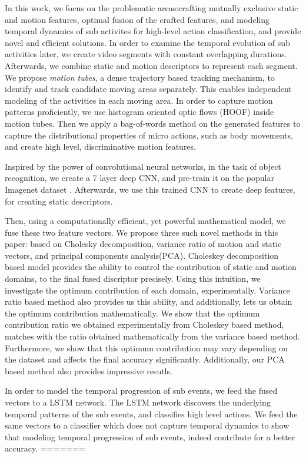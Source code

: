 In this work, we focus on the problematic areas:crafting mutually exclusive static and motion features, optimal fusion of the crafted features, and 
modeling temporal dynamics of sub activites for high-level action classification, and provide 
novel and efficient solutions. In order to examine the temporal evolution 
of sub activities later, we create video segments with constant overlapping durations. Afterwards, we combine static and motion
descriptors to represent each segment. We propose \textit{motion tubes},
a dense trajectory \cite{wang2011action} based tracking mechanism, to identify and track candidate moving areas
separately. This enables independent modeling of the activities in each moving area.
In order to capture motion patterns proficiently, we use histogram oriented optic flows (HOOF) \cite{chaudhry2009histograms}
inside motion tubes. Then we apply a bag-of-words method on the generated 
features to capture the distributional properties of micro actions, such as body movements, and create high level, discriminative motion features. 

Inspired by the power of convolutional neural networks, in the task of object recognition, we create a 7 layer deep
CNN, and pre-train it on the popular Imagenet dataset \cite{deng2012imagenet}.
Afterwards, we use this trained CNN to create deep features, for creating static descriptors. 

Then, using a computationally efficient, yet powerful mathematical model, we fuse these 
two feature vectors. We propose three such novel methods in this paper: based on
Cholesky decomposition, variance ratio of motion and static vectors, and principal components analysis(PCA). Choleskey decomposition based model provides the ability to 
control the contribution of static and motion domains,
to the final fused discriptor precisely. Using this intuition, we investigate the 
optimum contribution of each domain, experimentally.  Variance ratio based method also provides us this ability, and additionally, lets us
obtain the optimum contribution mathematically. We show that the optimum contribution ratio we obtained experimentally from Choleskey based method, 
matches with the ratio obtained mathematically from the variance based method. Furthermore, we show that this optimum contribution may
vary depending on the dataset and affects the final accuracy significantly. Additionally, our PCA based method also provides 
impressive resutls. 


In order to model the temporal progression of sub events, we feed the fused vectors to 
a LSTM network. The LSTM network discovers the underlying temporal patterns of the sub events, and classifies high level actions. 
We feed the same vectors to a classifier which does not capture temporal dynamics
to show that modeling temporal progression of sub events, indeed contribute for a better 
accuracy. 
=======

